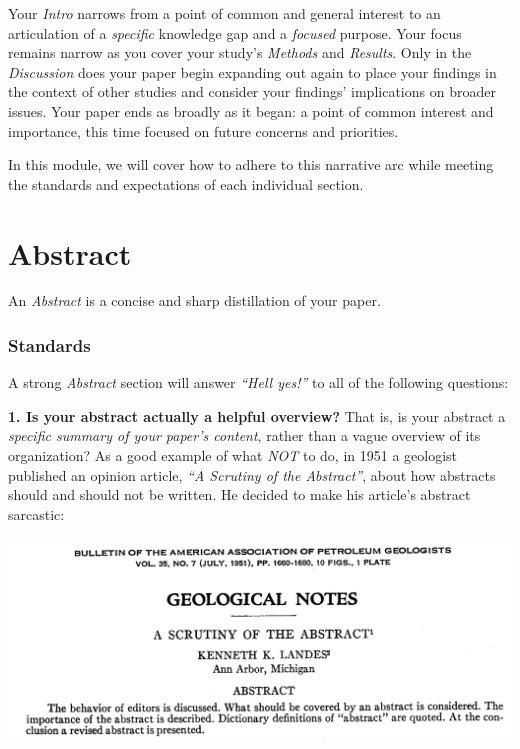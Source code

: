 \documentclass[
]{book}
\begin{document}
Your \emph{Intro} narrows from a point of common and general interest to an articulation of a \emph{specific} knowledge gap and a \emph{focused} purpose. Your focus remains narrow as you cover your study's \emph{Methods} and \emph{Results}. Only in the \emph{Discussion} does your paper begin expanding out again to place your findings in the context of other studies and consider your findings' implications on broader issues. Your paper ends as broadly as it began: a point of common interest and importance, this time focused on future concerns and priorities.

In this module, we will cover how to adhere to this narrative arc while meeting the standards and expectations of each individual section.

\hypertarget{abstract}{%
\section*{Abstract}\label{abstract}}

An \emph{Abstract} is a concise and sharp distillation of your paper.

\hypertarget{standards}{%
\subsubsection*{Standards}\label{standards}}

A strong \emph{Abstract} section will answer \emph{``Hell yes!''} to all of the following questions:

\textbf{1. Is your abstract actually a helpful overview?} That is, is your abstract a \emph{specific summary of your paper's content}, rather than a vague overview of its organization? As a good example of what \emph{NOT} to do, in 1951 a geologist published an opinion article, \emph{``A Scrutiny of the Abstract''}, about how abstracts should and should not be written. He decided to make his article's abstract sarcastic:

\includegraphics{img/abstracts-bad.png}
\end{document}
